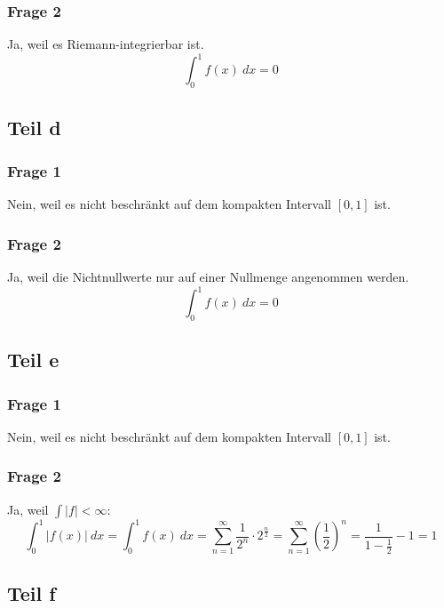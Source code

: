 \documentclass[10pt,a4paper]{article}
\begin{document}
\subsubsection{Frage 2}
Ja, weil es Riemann-integrierbar ist.
\begin{equation}
  \int_{0}^{1} f(x)\ dx = 0
\end{equation}

\subsection{Teil d}

\subsubsection{Frage 1}
Nein, weil es nicht beschränkt auf dem kompakten Intervall $[0, 1]$ ist.

\subsubsection{Frage 2}
Ja, weil die Nichtnullwerte nur auf einer Nullmenge angenommen werden.
\begin{equation}
  \int_{0}^{1} f(x)\ dx = 0
\end{equation}

\subsection{Teil e}

\subsubsection{Frage 1}
Nein, weil es nicht beschränkt auf dem kompakten Intervall $[0, 1]$ ist.

\subsubsection{Frage 2}
Ja, weil $\int |f| < \infty$:
\begin{equation}
  \int_{0}^{1} |f(x)|\ dx = \int_{0}^{1} f(x)\ dx = \sum_{n = 1}^{\infty} \frac{1}{2^{n}} \cdot 2^{\frac{n}{2}} = \sum_{n = 1}^{\infty} \left( \frac{1}{2} \right)^{n} = \frac{1}{1 - \frac{1}{2}} - 1 = 1
\end{equation}

\subsection{Teil f}
\end{document}
